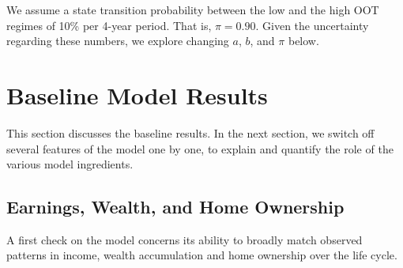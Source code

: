 \documentclass[letterpaper,12pt,dvipsnames,usenames]{article}
\theoremstyle{definition}
\begin{document}
\begin{spacing}{1.25}
We assume a state transition probability between the low and the high OOT regimes of 10\% per 4-year period. That is, $\pi=0.90$. Given the uncertainty regarding these numbers, we explore changing  $a$, $b$, and $\pi$ below.










\section{Baseline Model Results}

This section discusses the baseline results. In the next section, we switch off several features of the model one by one, to explain and quantify the role of the various model ingredients.

\subsection{Earnings, Wealth, and Home Ownership}


A first check on the model concerns its ability to broadly match observed patterns in  income, wealth accumulation and home ownership over the life cycle.


\end{spacing}
\end{document}
